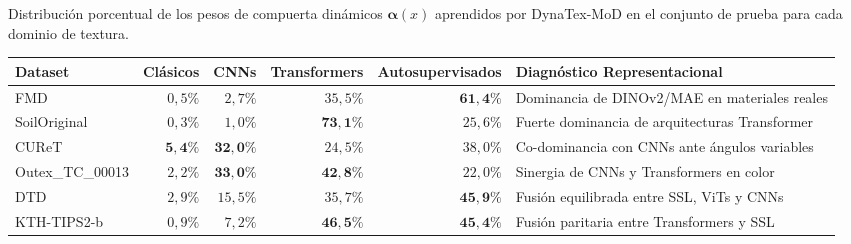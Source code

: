 \begin{resulttable}
\centering\fontsize{8}{10}\selectfont\setlength{\tabcolsep}{4.0pt}
\caption{Distribución porcentual de los pesos de compuerta dinámicos $\boldsymbol{\alpha}(x)$ aprendidos por DynaTex-MoD en el conjunto de prueba para cada dominio de textura.}
\label{tab:dynatex-gating}
\begin{tabular}{@{}lrrrrp{4.8cm}@{}}
\toprule
Dataset & Clásicos & CNNs & Transformers & Autosupervisados & Diagnóstico Representacional \\
\midrule
FMD & $0{,}5\%$ & $2{,}7\%$ & $35{,}5\%$ & $\mathbf{61{,}4\%}$ & Dominancia de DINOv2/MAE en materiales reales \\
SoilOriginal & $0{,}3\%$ & $1{,}0\%$ & $\mathbf{73{,}1\%}$ & $25{,}6\%$ & Fuerte dominancia de arquitecturas Transformer \\
CUReT & $\mathbf{5{,}4\%}$ & $\mathbf{32{,}0\%}$ & $24{,}5\%$ & $38{,}0\%$ & Co-dominancia con CNNs ante ángulos variables \\
Outex\_TC\_00013 & $2{,}2\%$ & $\mathbf{33{,}0\%}$ & $\mathbf{42{,}8\%}$ & $22{,}0\%$ & Sinergia de CNNs y Transformers en color \\
DTD & $2{,}9\%$ & $15{,}5\%$ & $35{,}7\%$ & $\mathbf{45{,}9\%}$ & Fusión equilibrada entre SSL, ViTs y CNNs \\
KTH-TIPS2-b & $0{,}9\%$ & $7{,}2\%$ & $\mathbf{46{,}5\%}$ & $\mathbf{45{,}4\%}$ & Fusión paritaria entre Transformers y SSL \\
\bottomrule
\end{tabular}
\end{resulttable}
